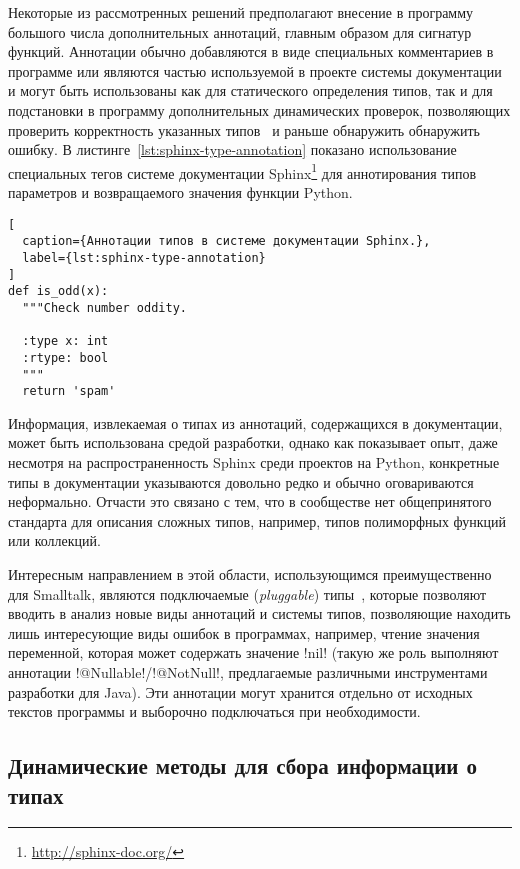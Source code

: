 Некоторые из рассмотренных решений предполагают внесение в программу большого
числа дополнительных аннотаций, главным образом для сигнатур функций. Аннотации
обычно добавляются в виде специальных комментариев в программе или являются
частью используемой в проекте системы документации и могут быть использованы
как для статического определения типов, так и для подстановки в программу
дополнительных динамических проверок, позволяющих проверить 
корректность указанных типов~\cite{Furr2009} и раньше обнаружить обнаружить
ошибку. В листинге~\ref{lst:sphinx-type-annotation} показано использование
специальных тегов системе документации
Sphinx\footnote{\url{http://sphinx-doc.org/}} для аннотирования типов параметров
и возвращаемого значения функции Python.

\begin{lstlisting}[
  caption={Аннотации типов в системе документации Sphinx.},
  label={lst:sphinx-type-annotation}
]
def is_odd(x):
  """Check number oddity.

  :type x: int
  :rtype: bool
  """
  return 'spam'
\end{lstlisting}

Информация, извлекаемая о типах из аннотаций, содержащихся в
документации, может быть использована средой разработки, однако как показывает
опыт, даже несмотря на распространенность Sphinx среди проектов на Python,
конкретные типы в документации указываются довольно редко и обычно оговариваются
неформально.  Отчасти это связано с тем, что в сообществе нет общепринятого
стандарта для описания сложных типов, например, типов полиморфных функций или
коллекций.

Интересным направлением в этой области, использующимся преимущественно для
Smalltalk, являются подключаемые (\emph{pluggable}) типы~\cite{Haldiman2009},
которые позволяют вводить в анализ новые виды аннотаций и системы типов,
позволяющие находить лишь интересующие виды ошибок в программах, например,
чтение значения переменной, которая может содержать значение !nil! (такую же
роль выполняют аннотации !@Nullable!/!@NotNull!, предлагаемые различными инструментами
разработки для Java). Эти аннотации могут хранится отдельно от исходных текстов
программы и выборочно подключаться при необходимости.


\subsection{Динамические методы для сбора информации о типах}
\label{sec:dynamic-checks}

